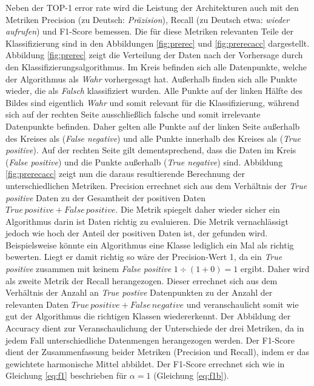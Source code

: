 Neben der TOP-1 error rate wird die Leistung der Architekturen auch mit den Metriken Precision (zu Deutsch: \textit{Präzision}), Recall (zu Deutsch etwa: \textit{wieder aufrufen}) und F1-Score bemessen. Die für diese Metriken relevanten Teile der Klassifizierung sind in den Abbildungen \ref{fig:prerec} und \ref{fig:prerecacc} dargestellt. Abbildung \ref{fig:prerec} zeigt die Verteilung der Daten nach der Vorhersage durch den Klassifizierungsalgorithmus. Im Kreis befinden sich alle Datenpunkte, welche der Algorithmus als \textit{Wahr} vorhergesagt hat. Außerhalb finden sich alle Punkte wieder, die als \textit{Falsch} klassifiziert wurden. Alle Punkte auf der linken Hälfte des Bildes sind eigentlich \textit{Wahr} und somit relevant für die Klassifizierung, während sich auf der rechten Seite ausschließlich falsche und somit irrelevante Datenpunkte befinden. Daher gelten alle Punkte auf der linken Seite  außerhalb des Kreises als (\textit{False negative}) und alle Punkte innerhalb des Kreises als (\textit{True positive}). Auf der rechten Seite gilt dementsprechend, dass die Daten im Kreis (\textit{False positive}) und die Punkte außerhalb  (\textit{True negative}) sind. Abbildung \ref{fig:prerecacc} zeigt nun die daraus resultierende Berechnung der unterschiedlichen Metriken. Precision errechnet sich aus dem Verhältnis der \textit{True positive} Daten zu der Gesamtheit der positiven Daten $True\,positive + False\,positive$. Die Metrik spiegelt daher wieder sicher ein Algorithmus darin ist Daten richtig zu evaluieren. Die Metrik vernachlässigt jedoch wie hoch der Anteil der positiven Daten ist, der gefunden wird. Beispielsweise könnte ein Algorithmus eine Klasse lediglich ein Mal als richtig bewerten. Liegt er damit richtig so wäre der Precision-Wert 1, da ein \textit{True positive} zusammen mit keinem \textit{False positive} $1 \div (1+0) = 1$ ergibt. Daher wird als zweite Metrik der Recall herangezogen. Dieser errechnet sich aus dem Verhältnis der Anzahl an \textit{True postive} Datenpunkten zu der Anzahl der relevanten Daten $True\,positive + False\,negative$ und veranschaulicht somit wie gut der Algorithmus die richtigen Klassen wiedererkennt. Der Abbildung der Accuracy dient zur Veranschaulichung der Unterschiede der drei Metriken, da in jedem Fall unterschiedliche Datenmengen herangezogen werden. Der F1-Score dient der Zusammenfassung beider Metriken (Precision und Recall), indem er das gewichtete harmonische Mittel abbildet. Der F1-Score errechnet sich wie in Gleichung \ref{eq:f1} beschrieben für $\alpha = 1$ (Gleichung \ref{eq:f1b}). 

